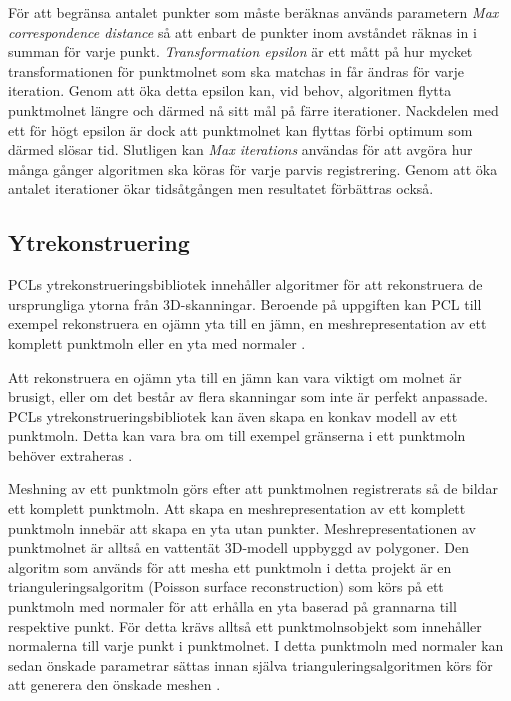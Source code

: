 För att begränsa antalet punkter som måste beräknas används parametern \textit{Max correspondence distance} så att enbart de punkter inom avståndet räknas in i summan för varje punkt. \textit{Transformation epsilon} är ett mått på hur mycket transformationen för punktmolnet som ska matchas in får ändras för varje iteration. Genom att öka detta epsilon kan, vid behov, algoritmen flytta punktmolnet längre och därmed nå sitt mål på färre iterationer. Nackdelen med ett för högt epsilon är dock att punktmolnet kan flyttas förbi optimum som därmed slösar tid. Slutligen kan \textit{Max iterations} användas för att avgöra hur många gånger algoritmen ska köras för varje parvis registrering. Genom att öka antalet iterationer ökar tidsåtgången men resultatet förbättras också.

\subsection{Ytrekonstruering}
PCLs ytrekonstrueringsbibliotek innehåller algoritmer för att rekonstruera de ursprungliga ytorna från 3D-skanningar. Beroende på uppgiften kan PCL till exempel rekonstruera en ojämn yta till en jämn, en meshrepresentation av ett komplett punktmoln eller en yta med normaler \cite{pcl_surface_reconstruction}.

Att rekonstruera en ojämn yta till en jämn kan vara viktigt om molnet är brusigt, eller om det består av flera skanningar som inte är perfekt anpassade. PCLs ytrekonstrueringsbibliotek kan även skapa en konkav modell av ett punktmoln. Detta kan vara bra om till exempel gränserna i ett punktmoln behöver extraheras \cite{pcl_surface_reconstruction}.

Meshning av ett punktmoln görs efter att punktmolnen registrerats så de bildar ett komplett punktmoln. Att skapa en meshrepresentation av ett komplett punktmoln innebär att skapa en yta utan punkter. Meshrepresentationen av punktmolnet är alltså en vattentät 3D-modell uppbyggd av polygoner. Den algoritm som används för att mesha ett punktmoln i detta projekt är en trianguleringsalgoritm (Poisson surface reconstruction) som körs på ett punktmoln med normaler för att erhålla en yta baserad på grannarna till respektive punkt. För detta krävs alltså ett punktmolnsobjekt som innehåller normalerna till varje punkt i punktmolnet. I detta punktmoln med normaler kan sedan önskade parametrar sättas innan själva trianguleringsalgoritmen körs för att generera den önskade meshen \cite{pcl_surface_reconstruction}\cite{pcl_triangulation_algorithm}. 


